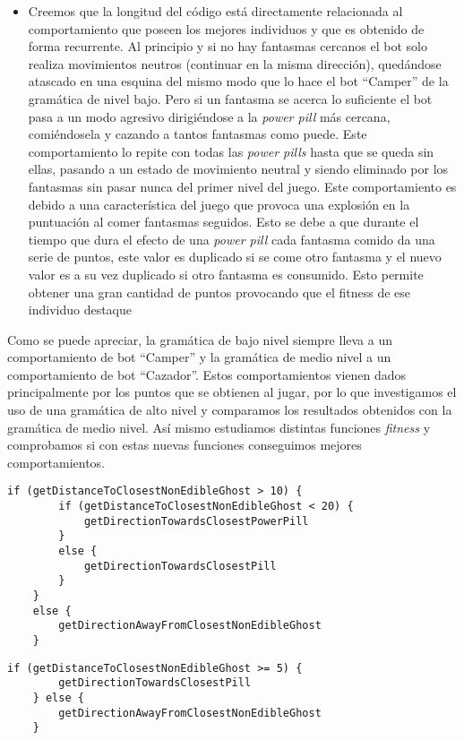 \begin{itemize}
\item Creemos que la longitud del código está directamente relacionada al comportamiento que poseen los mejores individuos y que es obtenido de forma recurrente. Al principio y si no hay fantasmas cercanos el bot solo realiza movimientos neutros (continuar en la misma dirección), quedándose atascado en una esquina del mismo modo que lo hace el bot ``Camper'' de la gramática de nivel bajo. Pero si un fantasma se acerca lo suficiente el bot pasa a un modo agresivo dirigiéndose a la \textit{power pill} más cercana, comiéndosela y cazando a tantos fantasmas como puede. Este comportamiento lo repite con todas las \textit{power pills} hasta que se queda sin ellas, pasando a un estado de movimiento neutral y siendo eliminado por los fantasmas sin pasar nunca del primer nivel del juego. Este comportamiento es debido a una característica del juego que provoca una explosión en la puntuación al comer fantasmas seguidos. Esto se debe a que durante el tiempo que dura el efecto de una \textit{power pill} cada fantasma comido da una serie de puntos, este valor es duplicado si se come otro fantasma y el nuevo valor es a su vez duplicado si otro fantasma es consumido. Esto permite obtener una gran cantidad de puntos provocando que el fitness de ese individuo destaque
\end{itemize}

Como se puede apreciar, la gramática de bajo nivel siempre lleva a un comportamiento de bot ``Camper'' y la gramática de medio nivel a un comportamiento de bot ``Cazador''. Estos comportamientos vienen dados principalmente por los puntos que se obtienen al jugar, por lo que investigamos el uso de una gramática de alto nivel y comparamos los resultados obtenidos con la gramática de medio nivel. Así mismo estudiamos distintas funciones \textit{fitness} y comprobamos si con estas nuevas funciones conseguimos mejores comportamientos.

\begin{lstlisting}[caption={Mejor individuo producido usando la gramática de medio nivel para evolucionar contra Random Ghosts.}]
    if (getDistanceToClosestNonEdibleGhost > 10) {
        if (getDistanceToClosestNonEdibleGhost < 20) {
            getDirectionTowardsClosestPowerPill 
        }
        else {
            getDirectionTowardsClosestPill
        }
    }
    else {
        getDirectionAwayFromClosestNonEdibleGhost
    }
\end{lstlisting}

\begin{lstlisting}[caption={Mejor individuo producido usando la gramática de medio nivel para evolucionar contra Legacy Ghosts.}]
    if (getDistanceToClosestNonEdibleGhost >= 5) {
        getDirectionTowardsClosestPill
    } else {
        getDirectionAwayFromClosestNonEdibleGhost
    }
\end{lstlisting}

